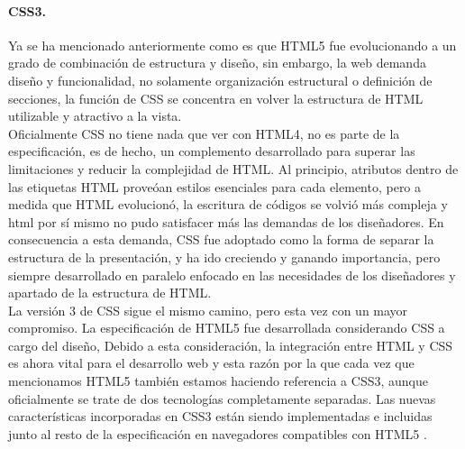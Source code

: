 \documentclass[12pt, a4paper, titlepage]{report}
\begin{document}
			\paragraph{CSS3.\\}
			Ya se ha mencionado anteriormente como es que HTML5 fue evolucionando a un grado de combinación de estructura y diseño, sin embargo, la web demanda diseño y funcionalidad, no solamente organización estructural o definición de secciones, la función de CSS se concentra en volver la estructura de HTML utilizable y atractivo a la vista.\\
			
			Oficialmente CSS no tiene nada que ver con HTML4, no es parte de la especificación, es de hecho, un complemento desarrollado para superar las limitaciones y reducir la complejidad de HTML. Al principio, atributos dentro de las etiquetas HTML proveóan estilos esenciales para cada elemento, pero a medida que HTML evolucionó, la escritura de códigos se volvió más compleja y html por sí mismo no pudo satisfacer más las demandas de los diseñadores. En consecuencia a esta demanda, CSS fue adoptado como la forma de separar la estructura de la presentación, y ha ido creciendo y ganando importancia, pero siempre desarrollado en paralelo enfocado en las necesidades de los diseñadores y apartado de la estructura de HTML.\\
			
			La versión 3 de CSS sigue el mismo camino, pero esta vez con un mayor compromiso. La especificación de HTML5 fue desarrollada considerando CSS a cargo del diseño, Debido a esta consideración, la integración entre HTML y CSS es ahora vital para el desarrollo web y esta razón por la que cada vez que mencionamos HTML5 también estamos haciendo referencia a CSS3, aunque oficialmente se trate de dos tecnologías completamente separadas. Las nuevas características incorporadas en CSS3 están siendo implementadas e incluidas junto al resto de la especificación en navegadores compatibles con HTML5 \cite{refElGranLibro}.
			
\end{document}
